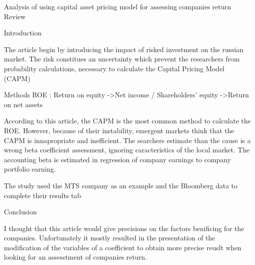 								Analysis of using capital asset pricing model for assessing companies return
																Review

	Introduction

The article begin by introducing the impact of risked investment on the russian market. 
The risk constitues an uncertainty which prevent the researchers from probability calculations, necessary to calculate the Capital Pricing Model (CAPM)

	Methods
ROE : Return on equity 
	->Net income / Shareholders' equity
	->Return on net assets

According to this article, the CAPM is the most common method to calculate the ROE.
However, because of their instability, emergent markets think that the CAPM is innapropriate and inefficient.
The searchers estimate than the cause is a wrong beta coefficient assessment, ignoring caracteristics of the local market.
The accounting beta is estimated in regression of company earnings to company portfolio earning.

The study used the MTS company as an example and the Bloomberg data to complete their results tab

Conclusion

I thought that this article would give precisions on the factors benificing for the companies.
Unfortunately it mostly resulted in the presentation of the modification of the variables of a coefficient to obtain more precise reuslt when looking for an assesstment of companies return.
